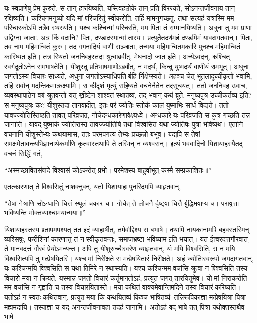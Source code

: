 \vakya यः स्वप्राणेषु प्रेम कुरुते, स तान् हारयिष्यति, यस्त्विहलोके तान् प्रति विरज्यते, सोऽनन्तजीवनाय तान् रक्षिष्यति।
\vakya कश्चिनमनुष्यो यदि मां परिचरितुं स्वीकरोति, तर्हि मामनुगच्छतु, तथा सत्यहं यत्रास्मि मम परिचारकोऽपि तत्रैव स्थस्यति। यश्च कश्चिन्मां परिचरति, मम पिता तं सम्मानयिष्यति।
\vakya अधुना तु मम प्राणा उद्विग्ना जाताः, अत्र किं वदानि? पितः, दण्डादस्मान्मां तारय। प्रत्युतैतदर्थमहं दण्डमिमं यावदागतवान्।
\vakya पितः, तव नाम महिमान्वितं कुरु। तद गगनादियं वाणी सञ्जाता, तन्मया महिमान्वितमकारि पुनश्च महिमान्वितं कारिष्यत इति।
\vakya तत्र स्थितो जननिवहस्तदा श्रुत्वाब्रवीत्, मेघनादो जात इति। अन्येऽवदन्, कश्चित् स्वर्गदूतोऽनेन समभाषतेति।
\vakya यीशुस्तु प्रतिभाषमाणोऽब्रवीत्, न मदर्थं, किन्तु युष्मदर्थं वाणीयं समभूत्।
\vakya अधुना जगतोऽस्य विचारः साध्यते, अधुना जगतोऽस्याधिपति र्बहि र्निक्षेप्स्यते।
\vakya अहञ्च चेत् भूतलादुच्चीकृतो भवामि, तर्हि सर्वान् मदन्तिकमाक्रक्ष्यामि।
\vakya स कीदृशं मृत्युं सहिष्यते वचनेनैतेन तदसूचयत्।
\vakya ततो जननिवह उवाच, व्यवस्थापाठेन वयं श्रुतवन्तो यत् ख्रीष्टेन शाश्वतं स्थातव्यं, तद् भवान् कथं ब्रूते, मनुष्यपुत्र उच्चीकर्तव्य इति? स मनुष्यपुत्रः कः?
\vakya यीशुस्तदा तानवादीत्, इतः परं ज्योतिः स्तोकं कालं युष्माभिः सार्धं विद्यते। ततो यावज्ज्योतिस्तिष्ठति तावत् परिव्रजत, नोचेदन्धकारेणावेक्ष्यध्वे। अन्धकारे यः परिव्रजति स कुत्र गच्छति तन्न जानाति।
\vakya यावद् युष्माकं ज्योतिरास्ते तावज्ज्योतिषि तथा विश्वसित यथा ज्योतिषः पुत्रा भविष्यथ। एतानि वचनानि यीशुस्तेभ्यः कथयामास, ततः परमपगत्य तेभ्यः प्रच्छन्नो बभूव।
\vakya यद्यपि स तेषां समक्षमेतावन्त्यभिज्ञानार्थकर्माणि कृतवांस्तथापि ते तस्मिन् न व्यश्वसन्।
\vakya इत्थं भववादिनो यिशायाहस्यैतद् वचनं सिद्धिं गतं,
\begin{poem}
\startwithline “अस्मच्छावितसंवादे विश्वासं कोऽकरोत् प्रभो।
\pline परमेशस्य बाहुर्वाभूत् कस्मै सम्प्रकाशितः॥”
\end{poem}
\vakya एतत्कारणात् ते विश्वसितुं नाशक्नुवन्, यतो यिशायाहः पुनरिदमपि व्याहृतवान्,
\begin{poem}
\startwithvakya “तेषां नेत्राणि सोऽन्धानि चित्तं स्थूलं चकार च।
\pline नोचेत् ते लोचनै र्दृष्ट्वा चित्तै र्बुद्धिमवाप्य च।
\pline परावृत्ता भविष्यन्ति मोक्तव्याश्चामयान्मया॥”
\end{poem}
\vakya यिशायाहस्तस्य प्रतापमपश्यत् तत इदं व्याहार्षीत्, तमेवोद्दिश्य स बभाषे।
\vakya तथापि नायकानामपि बहवस्तस्मिन् व्यश्सिषुः, फरीशिनां कारणात्तु तं न स्वीकृतवन्तः, समाजभ्रष्टा भविष्याम इति भयात्।
\vakya यत ईश्वरदत्तगौरवात् ते मानवदत्तं गौरवं प्रेयोऽमन्यन्त।
\vakya अपि तु यीशुरुच्चैःस्वरेण व्याहृतवान्, यो मयि विश्वसिति, स न मयि विश्वसित्यपि तु मत्प्रेषयितरि।
\vakya यश्च मां निरीक्षते स मत्प्रेषयितारं निरीक्षते।
\vakya अहं ज्योतिःस्वरूपो जगदागतवान्, यः कश्चिन्मयि विश्वसिति स यथा तिमिरे न स्थास्यति।
\vakya यश्च कश्चिन्मम वचांसि श्रुत्वा न विश्वसिति तस्य विचारो मया न क्रियते, यस्मान्न जगतो विचारं कर्तुमागतोऽहं, प्रत्युत जगत् तारयितुमेव।
\vakya यो मां निराकरोति मम वचांसि न गृह्णाति च तस्य विचारयितास्ते। मया कथितं वाक्यमेवान्तिमदिने तस्य विचारं करिष्यति।
\vakya यतोऽहं न स्वतः कथितवान्, प्रत्युत मया किं कथयितव्यं किञ्च भाषितव्यं, तन्निरूपिकाज्ञा मत्प्रेषयित्रा पित्रा मह्यमदायि।
\vakya तस्याज्ञा च यद् अनन्तजीवनावहा तदहं जानामि। अतोऽहं यद् भाषे तत् पित्रा यथोक्तस्तथैव भाषे\eoc